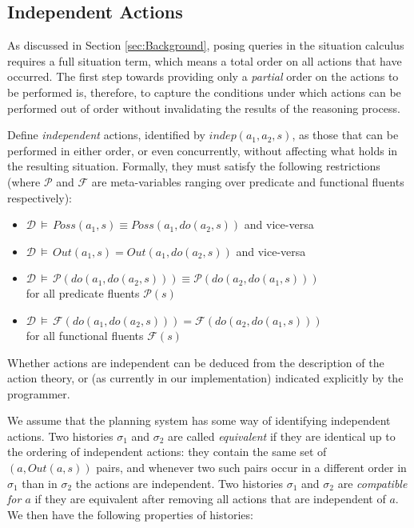 \subsection{Independent Actions\label{sec:JointExec:IndepActs}}

As discussed in Section \ref{sec:Background}, posing queries in the
situation calculus requires a full situation term, which means a total
order on all actions that have occurred. The first step towards providing
only a \emph{partial} order on the actions to be performed is, therefore,
to capture the conditions under which actions can be performed out
of order without invalidating the results of the reasoning process.

Define \emph{independent} actions, identified by $indep(a_{1},a_{2},s)$,
as those that can be performed in either order, or even concurrently,
without affecting what holds in the resulting situation. Formally,
they must satisfy the following restrictions (where $\mathcal{P}$
and $\mathcal{F}$ are meta-variables ranging over predicate and functional
fluents respectively):

\begin{itemize}
\item $\mathcal{D}\,\models\, Poss(a_{1},s)\equiv Poss(a_{1},do(a_{2},s))$
and vice-versa 
\item $\mathcal{D}\,\models\, Out(a_{1},s)=Out(a_{1},do(a_{2},s))$ and
vice-versa 
\item $\mathcal{D}\,\models\,\mathcal{P}(do(a_{1},do(a_{2},s)))\equiv\mathcal{P}(do(a_{2},do(a_{1},s)))$\\
 for all predicate fluents $\mathcal{P}(s)$ 
\item $\mathcal{D}\,\models\,\mathcal{F}(do(a_{1},do(a_{2},s)))=\mathcal{F}(do(a_{2},do(a_{1},s)))$\\
 for all functional fluents $\mathcal{F}(s)$ 
\end{itemize}
Whether actions are independent can be deduced from the description
of the action theory, or (as currently in our implementation) indicated
explicitly by the programmer.

We assume that the planning system has some way of identifying independent
actions. Two histories $\sigma_{1}$ and $\sigma_{2}$ are called
\emph{equivalent} if they are identical up to the ordering of independent
actions: they contain the same set of $(a,Out(a,s))$ pairs, and whenever
two such pairs occur in a different order in $\sigma_{1}$ than in
$\sigma_{2}$ the actions are independent. Two histories $\sigma_{1}$
and $\sigma_{2}$ are \emph{compatible for $a$} if they are equivalent
after removing all actions that are independent of $a$. We then have
the following properties of histories:

